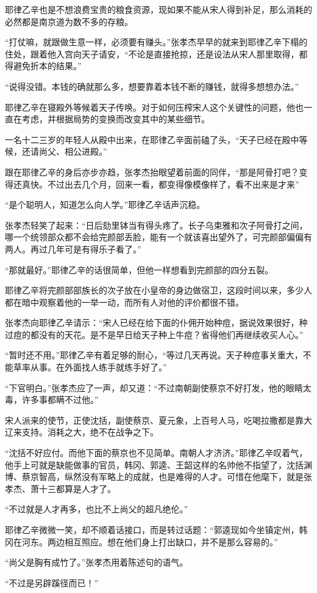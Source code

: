 耶律乙辛也是不想浪费宝贵的粮食资源，现如果不能从宋人得到补足，那么消耗的必然都是南京道为数不多的存粮。

“打仗嘛，就跟做生意一样，必须要有赚头。”张孝杰早早的就来到耶律乙辛下榻的住处，跟着他入宫向天子请安，“不论是直接抢掠，还是设法从宋人那里取得，都得避免折本的结果。”

“说得没错。本钱的确就那么多，想要靠着本钱不断的赚钱，就得多想想办法。”

耶律乙辛在寝殿外等候着天子传唤。对于如何压榨宋人这个关键性的问题，他也一直在考虑，并根据局势的变换而改变其中的某些细节。

一名十二三岁的年轻人从殿中出来，在耶律乙辛面前磕了头，“天子已经在殿中等候，还请尚父、相公进殿。”

跟在耶律乙辛的身后亦步亦趋，张孝杰抬眼望着前面的同伴，“那是阿骨打吧？变得还真快。不过出去几个月，回来一看，都变得像模像样了，看不出来是才来”

“是个聪明人，知道怎么向人学。”耶律乙辛话声沉稳。

张孝杰轻笑了起来：“日后劾里钵当有得头疼了。长子乌束雅和次子阿骨打之间，哪一个统领部众都不会给完颜部丢脸，能有一个就该喜出望外了，可完颜部偏偏有两人。再过几年可是有得乐子看了。”

“那就最好。”耶律乙辛的话很简单，但他一样想看到完颜部的四分五裂。

耶律乙辛将完颜部部族长的次子放在小皇帝的身边做宿卫，这段时间以来，多少人都在暗中观察着他的一举一动，而所有人对他的评价都很不错。

张孝杰向耶律乙辛请示：“宋人已经在给下面的仆佣开始种痘，据说效果很好，种过痘的都没有的天花。是不是早日给天子种上牛痘？省得他们再继续收买人心。”

“暂时还不用。”耶律乙辛有着足够的耐心，“等过几天再说。天子种痘事关重大，不能草率从事。在外面找人练手就练手好了。”

“下官明白。”张孝杰应了一声，却又道：“不过南朝副使蔡京不好打发，他的眼睛太毒，许多事都瞒不过他。”

宋人派来的使节，正使沈括，副使蔡京、夏元象，上百号人马，吃喝拉撒都是靠大辽来支持。消耗之大，绝不在战争之下。

“沈括不好应付。而他下面的蔡京也不见简单。南朝人才济济。”耶律乙辛叹着气，他手上可就是缺能做事的官员，韩冈、郭逵、王韶这样的名帅他不指望了，沈括渊博、蔡京智高，纵然没有军略上的成就，也是难得的人才。可惜在他麾下，就是张孝杰、萧十三都算是人才了。

“不过就是人才再多，也比不上尚父的超凡绝伦。”

耶律乙辛微微一笑，却不顺着话接口，而是转过话题：“郭逵现如今坐镇定州，韩冈在河东。两边相互照应。想在他们身上打出缺口，并不是那么容易的。”

“尚父是胸有成竹了。”张孝杰用着陈述句的语气。

“不过是另辟蹊径而已！”

